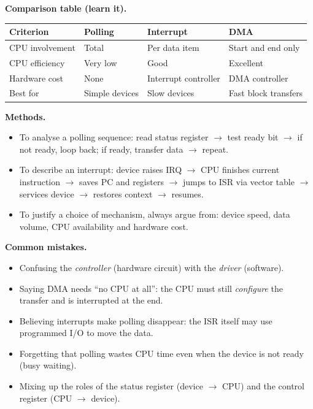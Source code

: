 \documentclass[11pt]{article}
\begin{document}
\begin{bilan}
\textbf{Comparison table (learn it).}
\begin{center}
\begin{tabularx}{\linewidth}{|l|X|X|X|}
\hline
\rowcolor{popblueL} Criterion & Polling & Interrupt & DMA \\
\hline
CPU involvement & Total & Per data item & Start and end only \\
\hline
CPU efficiency & Very low & Good & Excellent \\
\hline
Hardware cost & None & Interrupt controller & DMA controller \\
\hline
Best for & Simple devices & Slow devices & Fast block transfers \\
\hline
\end{tabularx}
\end{center}

\textbf{Methods.}
\begin{itemize}
\item To analyse a polling sequence: read status register $\rightarrow$ test ready bit $\rightarrow$ if not ready, loop back; if ready, transfer data $\rightarrow$ repeat.
\item To describe an interrupt: device raises IRQ $\rightarrow$ CPU finishes current instruction $\rightarrow$ saves PC and registers $\rightarrow$ jumps to ISR via vector table $\rightarrow$ services device $\rightarrow$ restores context $\rightarrow$ resumes.
\item To justify a choice of mechanism, always argue from: device speed, data volume, CPU availability and hardware cost.
\end{itemize}

\textbf{Common mistakes.}
\begin{itemize}
\item Confusing the \emph{controller} (hardware circuit) with the \emph{driver} (software).
\item Saying DMA needs ``no CPU at all'': the CPU must still \emph{configure} the transfer and is interrupted at the end.
\item Believing interrupts make polling disappear: the ISR itself may use programmed I/O to move the data.
\item Forgetting that polling wastes CPU time even when the device is not ready (busy waiting).
\item Mixing up the roles of the status register (device $\rightarrow$ CPU) and the control register (CPU $\rightarrow$ device).
\end{itemize}


\end{bilan}
\end{document}
